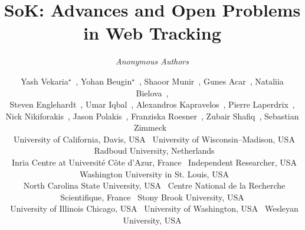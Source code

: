 \documentclass[letterpaper,twocolumn,10pt]{article}
\begin{document}

\date{}

\title{\Large \bf SoK: Advances and Open Problems in Web Tracking}

\ifanonymous
\author{\em Anonymous Authors}
\else
\author{
{\rm Yash Vekaria$^\star$~\ucDavis{}},
{\rm Yohan Beugin$^\star$~\uwMadison{}},
{\rm Shaoor Munir~\ucDavis{}},
{\rm Gunes Acar~\radboud{}},
{\rm Nataliia Bielova~\inria{}}, \\
{\rm Steven Englehardt~\independent{}},
{\rm Umar Iqbal~\washU{}},
{\rm Alexandros Kapravelos~\ncstate{}},
{\rm Pierre Laperdrix~\cnrs{}},\\
{\rm Nick Nikiforakis~\stonybrook{}},
{\rm Jason Polakis~\uic{}},
{\rm Franziska Roesner~\uwashington{}},
{\rm Zubair Shafiq~\ucDavis{}},
{\rm Sebastian Zimmeck~\wu{}}\\
%
\ucDavis{}~\small{University of California, Davis, USA}\hfill{}
\uwMadison{}~\small{University of Wisconsin–Madison, USA}\hfill{}
\radboud{}~\small{Radboud University, Netherlands}\\
\inria{}~\small{Inria Centre at Université Côte d’Azur, France}\hfill{}
\independent{}~\small{Independent Researcher, USA}\hfill{}
\washU{}~\small{Washington University in St. Louis, USA}\\
\ncstate{}~\small{North Carolina State University, USA}\hfill{}
\cnrs{}~\small{Centre National de la Recherche Scientifique, France}\hfill{}
\stonybrook{}~\small{Stony Brook University, USA}\\
\uic{}~\small{University of Illinois Chicago, USA}\hfill{}
\uwashington{}~\small{University of Washington, USA}\hfill{}
\wu{}~\small{Wesleyan University, USA}
}
\fi
\end{document}

